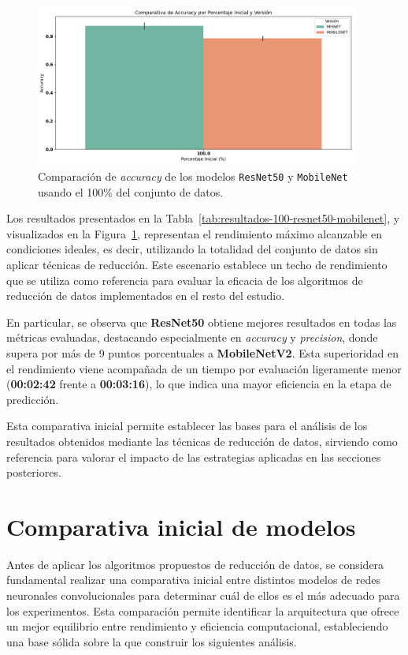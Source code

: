 \begin{figure}[htp]
    \centering
    \includegraphics[width=0.95\textwidth]{imagenes/evaluaciones/comparacion_modelos_100.png}
    \caption{Comparación de \textit{accuracy} de los modelos \texttt{ResNet50} y \texttt{MobileNet} usando el 100\% del conjunto de datos.}
    \label{fig:comparacion_modelos_100}
\end{figure}

Los resultados presentados en la Tabla~\ref{tab:resultados-100-resnet50-mobilenet}, y visualizados en la Figura~\ref{fig:comparacion_modelos_100},
representan el rendimiento máximo alcanzable en condiciones ideales,
es decir, utilizando la totalidad del conjunto de datos sin aplicar técnicas de reducción.
Este escenario establece un techo de rendimiento que se utiliza como referencia para evaluar la eficacia de
los algoritmos de reducción de datos implementados en el resto del estudio.

En particular, se observa que \textbf{ResNet50} obtiene mejores resultados en todas las métricas evaluadas,
destacando especialmente en \textit{accuracy} y \textit{precision}, donde supera por más de 9 puntos porcentuales a \textbf{MobileNetV2}.
Esta superioridad en el rendimiento viene acompañada de un tiempo por evaluación ligeramente menor (\textbf{00:02:42} frente a \textbf{00:03:16}),
lo que indica una mayor eficiencia en la etapa de predicción.

Esta comparativa inicial permite establecer las bases para el análisis de los resultados obtenidos mediante las técnicas de reducción de datos,
sirviendo como referencia para valorar el impacto de las estrategias aplicadas en las secciones posteriores.


\section{Comparativa inicial de modelos}\label{sec:comparativa-inicial-modelos}
Antes de aplicar los algoritmos propuestos de reducción de datos, se considera fundamental realizar una comparativa inicial entre distintos
modelos de redes neuronales convolucionales para determinar cuál de ellos es el más adecuado para los experimentos.
Esta comparación permite identificar la arquitectura que ofrece un mejor equilibrio entre rendimiento y eficiencia computacional,
estableciendo una base sólida sobre la que construir los siguientes análisis.

